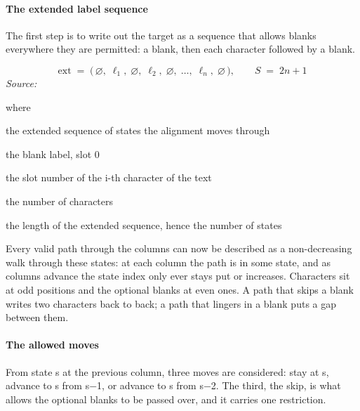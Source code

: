 \paragraph{The extended label sequence}
The first step is to write out the target as a sequence that allows blanks everywhere they are permitted: a blank, then each character followed by a blank.


\begin{equation}
\mathrm{ext} \;=\; \big(\,\varnothing,\; \ell_1,\; \varnothing,\; \ell_2,\; \varnothing,\; \dots,\; \ell_n,\; \varnothing \,\big), \qquad S \;=\; 2n+1
\end{equation}
\noindent\emph{Source: }\cite{graves2006}


\noindent where
\begin{description}[leftmargin=2.4em,style=nextline,font=\normalfont\ttfamily]\setlength\itemsep{1pt}
  \item[{$\mathrm{ext}$}] \normalfont the extended sequence of states the alignment moves through
  \item[{$\varnothing$}] \normalfont the blank label, slot 0
  \item[{$\ell_i$}] \normalfont the slot number of the i-th character of the text
  \item[{$n$}] \normalfont the number of characters
  \item[{$S$}] \normalfont the length of the extended sequence, hence the number of states
\end{description}
Every valid path through the columns can now be described as a non-decreasing walk through these states: at each column the path is in some state, and as columns advance the state index only ever stays put or increases. Characters sit at odd positions and the optional blanks at even ones. A path that skips a blank writes two characters back to back; a path that lingers in a blank puts a gap between them.


\paragraph{The allowed moves}
From state s at the previous column, three moves are considered: stay at s, advance to s from s$-$1, or advance to s from s$-$2. The third, the skip, is what allows the optional blanks to be passed over, and it carries one restriction.



